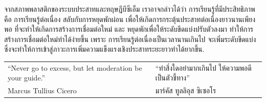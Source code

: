 {\begin{shaded}
จากสภาพพลาสติกของระบบประสาทและทฤษฎีบีซีเอ็ม
เราอาจกล่าวได้ว่า การเรียนรู้ที่มีประสิทธิภาพคือ
การเรียนรู้ต่อเนื่อง สลับกับการหยุดพักผ่อน
เพื่อให้เกิดการกระตุ้นประสาทต่อเนื่องยาวนานเพียงพอ ที่จะทำให้เกิดการสร้างการเชื่อมต่อใหม่
และ หยุดพักเพื่อให้ระดับขีดแบ่งปรับตัวลงมา ทำให้การสร้างการเชื่อมต่อใหม่ทำได้ง่ายขึ้น
เพราะ การเรียนรู้ต่อเนื่องเป็นเวลานานเกินไป จะเพิ่มระดับขีดแบ่งซึ่งจะทำให้การเข้าสู่ภาวะการเพิ่มความแข็งแรงเชิงประสาทระยะยาวทำได้ยากขึ้น.
\\

\hspace{-0.4in}
\begin{tabular}{ >{\arraybackslash}m{2.7in}  >{\arraybackslash}m{2.8in} }
``Never go to excess, but let moderation be your guide.''
&
``ทำสิ่งใดอย่ามากเกินไป ให้ความพอดีเป็นตัวชี้ทาง''
\\
Marcus Tullius Cicero
&
มาร์คัส ทูลลิอุส ซิเซอโร
\end{tabular} 























\end{shaded}}

